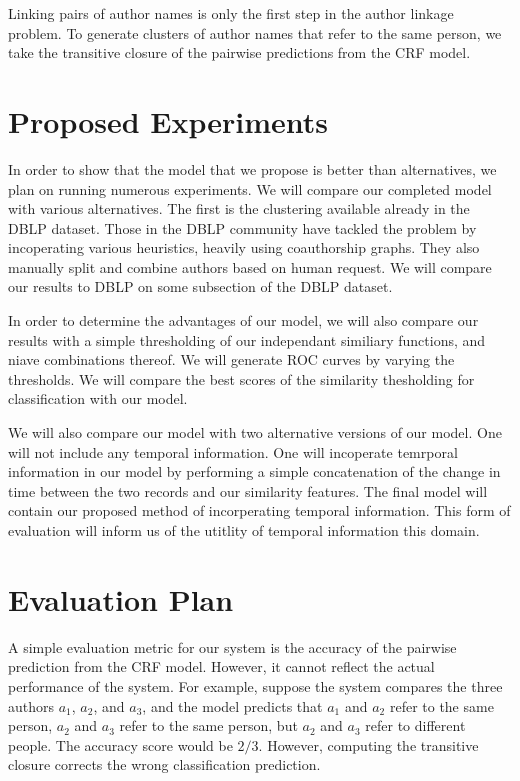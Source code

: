 \documentclass[twocolumn]{article}
\begin{document}
Linking pairs of author names is only the first step in the author
linkage problem.  To generate clusters of author names that refer to
the same person, we take the transitive closure of the pairwise
predictions from the CRF model.

\section{Proposed Experiments} %
\label{sec:proposed_experiments}
In order to show that the model that we propose is better than alternatives, we plan on running numerous experiments. We will compare our completed model with various alternatives. The first is the clustering available already in the DBLP dataset. Those in the DBLP community have tackled the problem by incoperating various heuristics, heavily using coauthorship graphs. They also manually split and combine authors based on human request. We will compare our results to DBLP on some subsection of the DBLP dataset. 

In order to determine the advantages of our model, we will also compare our results with a simple thresholding of our independant similiary functions, and niave combinations thereof. We will generate ROC curves by varying the thresholds. We will compare the best scores of the similarity thesholding for classification with our model.

We will also compare our model with two alternative versions of our model. One will not include any temporal information. One will incoperate temrporal information in our model by performing a simple concatenation of the change in time between the two records and our similarity features. The final model will contain our proposed method of incorperating temporal information. This form of evaluation will inform us of the utitlity of temporal information this domain.

\section{Evaluation Plan} %
\label{sec:evaluation}
A simple evaluation metric for our system is the accuracy
of the pairwise prediction from the CRF model.  However, it cannot
reflect the actual performance of the system.  For example, suppose
the system compares the three authors $a_1$, $a_2$, and $a_3$, and the
model predicts that $a_1$ and $a_2$ refer to the same person, $a_2$
and $a_3$ refer to the same person, but $a_2$ and $a_3$ refer to
different people.  The accuracy score would be $2/3$.  However,
computing the transitive closure corrects the wrong classification
prediction.
\end{document}
